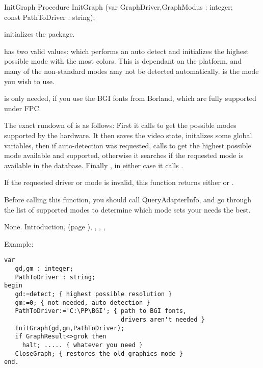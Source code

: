 \begin{procedure}{InitGraph}
\Declaration
Procedure InitGraph (var GraphDriver,GraphModus : integer;\\
const PathToDriver : string);

\Description

 initializes the  package.

 has two valid values:  which
performs an auto detect and initializes the highest possible mode with the most
colors. This is dependant on the platform, and many of the non-standard
modes amy not be detected automatically.  is the mode you
wish to use.

 is only needed, if you use the BGI fonts from
Borland, which are fully supported under FPC.

The exact rundown of  is as follows: First it calls
 to get the possible modes supported by the hardware.
It then saves the video state, initalizes some global variables, then if
auto-detection was requested, calls  to get the highest
possible mode available and supported, otherwise it searches if the requested
mode is available in the database. Finally , in either case it calls
.

If the requested driver or mode is invalid, this function returns either
 or .

Before calling this function, you should call QueryAdapterInfo, and
go through the list of supported modes to determine which mode sets
your needs the best.

\Errors
None.
\SeeAlso
Introduction, (page \pageref{se:Introduction}),
, , ,
\end{procedure}
Example:
\begin{verbatim}
var
   gd,gm : integer; 
   PathToDriver : string;
begin 
   gd:=detect; { highest possible resolution } 
   gm:=0; { not needed, auto detection }
   PathToDriver:='C:\PP\BGI'; { path to BGI fonts, 
                                drivers aren't needed } 
   InitGraph(gd,gm,PathToDriver); 
   if GraphResult<>grok then 
     halt; ..... { whatever you need } 
   CloseGraph; { restores the old graphics mode } 
end.
\end{verbatim}

